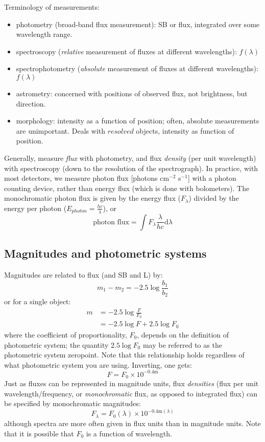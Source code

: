 \documentclass[12pt]{article}
\begin{document}
Terminology of measurements:
\begin{itemize}
    \item photometry (broad-band flux measurement): SB or flux, integrated
        over some wavelength range.
    \item spectroscopy (\emph{relative} measurement of fluxes at
        different wavelengths):
        $f(\lambda)$
    \item spectrophotometry (\emph{absolute} measurement of fluxes at
        different wavelengths):
        $f(\lambda)$
    \item astrometry: concerned with positions of observed flux, not brightness,
        but direction.
    \item morphology: intensity as a function of position;
        often, absolute measurements are unimportant. Deals with $resolved$
        objects, intensity as function of position.
\end{itemize}
Generally, measure \emph{flux} with photometry, and flux
\emph{density} (per unit wavelength)  with spectroscopy
(down to the resolution of the spectrograph).
In practice, with most detectors,
we measure photon flux [photons cm$^{-2}$ s$^{-1}$]
with a photon counting device,
rather than energy flux (which is done with bolometers).
The monochromatic photon flux is given by the
energy flux ($F_{\lambda}$)
divided by the
energy per photon ($E_{photon} = \frac{hc}{\lambda}$), or
$$ \textrm{photon\ flux} = \int F_{\lambda}
    \frac{\lambda}{hc} \textrm{d} \lambda $$


\subsection*{Magnitudes and photometric systems}
Magnitudes are related to flux (and SB and L) by:
    $$    m_1 - m_2 = -2.5 \log \frac{b_1}{b_2} $$
or for a single object:
\begin{align*}
    m &= -2.5 \log \frac{F}{F_0}\\
      &= -2.5 \log F + 2.5 \log F_0
\end{align*}
where the coefficient of proportionality, $F_0$, depends on the definition
of photometric system; the quantity $2.5 \log F_0$ may be referred to as
the photometric system zeropoint. Note that this relationship holds
regardless of what photometric system you are using. Inverting, one gets:
    $$ F = F_0 \times 10^{-0.4\textrm{m}} $$
Just as fluxes can be represented in magnitude units, flux \emph{densities}
(flux per unit wavelength/frequency, or \emph{monochromatic} flux,
as opposed to integrated flux)
can be specified by monochromatic magnitudes:
\begin{equation*}
    F_{\lambda} = F_0 (\lambda) \times 10^{-0.4 \textrm{m}(\lambda)}
\end{equation*}
although spectra are more often given in flux units than in magnitude units.
Note that it is possible that $F_0$ is a function of wavelength.
\end{document}
